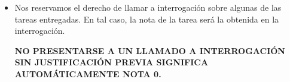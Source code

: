 \begin{itemize}
    
  \item
    Nos reservamos el derecho de llamar a interrogación
    sobre algunas de las tareas entregadas.
    En tal caso,
    la nota de la tarea será la obtenida en la interrogación.
    \begin{center}
      \Large{
        \textbf{NO PRESENTARSE A UN LLAMADO A INTERROGACIÓN SIN JUSTIFICACIÓN PREVIA SIGNIFICA AUTOMÁTICAMENTE NOTA 0.}
      }
    \end{center}
    
  \end{itemize}
